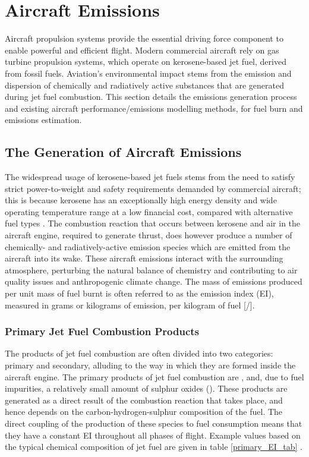 \section{Aircraft Emissions}
\label{emissions}
Aircraft propulsion systems provide the essential driving force component to enable powerful and efficient flight. Modern commercial aircraft rely on gas turbine propulsion systems, which operate on kerosene-based jet fuel, derived from fossil fuels. Aviation's environmental impact stems from the emission and dispersion of chemically and radiatively active substances that are generated during jet fuel combustion. This section details the emissions generation process and existing aircraft performance/emissions modelling methods, for fuel burn and emissions estimation.

\subsection{The Generation of Aircraft Emissions}
The widespread usage of kerosene-based jet fuels stems from the need to satisfy strict power-to-weight and safety requirements demanded by commercial aircraft; this is because kerosene has an exceptionally high energy density and wide operating temperature range at a low financial cost, compared with alternative fuel types \cite{Hemighaus2007, USDOE_2020}. The combustion reaction that occurs between kerosene and air in the aircraft engine, required to generate thrust, does however produce a number of chemically- and radiatively-active emission species which are emitted from the aircraft into its wake. These aircraft emissions interact with the surrounding atmosphere, perturbing the natural balance of chemistry and contributing to air quality issues and anthropogenic climate change. The mass of emissions produced per unit mass of fuel burnt is often referred to as the emission index (EI), measured in grams or kilograms of emission, per kilogram of fuel [/].

\subsubsection{Primary Jet Fuel Combustion Products}
The products of jet fuel combustion are often divided into two categories: primary and secondary, alluding to the way in which they are formed inside the aircraft engine. The primary products of jet fuel combustion are ,  and, due to fuel impurities, a relatively small amount of sulphur oxides (). These products are generated as a direct result of the combustion reaction that takes place, and hence depends on the carbon-hydrogen-sulphur composition of the fuel. The direct coupling of the production of these species to fuel consumption means that they have a constant EI throughout all phases of flight. Example values based on the typical chemical composition of jet fuel are given in table \ref{primary_EI_tab} \cite{IPCC1999}.

